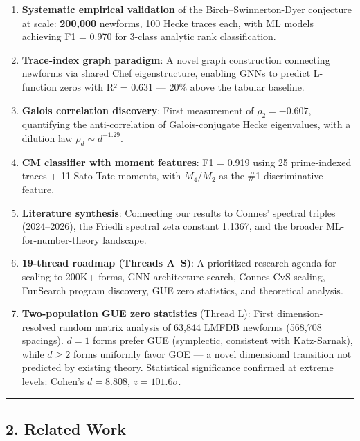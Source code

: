 \documentclass[
]{article}
\begin{document}
\begin{enumerate}
\def\labelenumi{\arabic{enumi}.}
\item
  \textbf{Systematic empirical validation} of the Birch--Swinnerton-Dyer
  conjecture at scale: \textbf{200,000} newforms, 100 Hecke traces each,
  with ML models achieving F1 = 0.970 for 3-class analytic rank
  classification.
\item
  \textbf{Trace-index graph paradigm}: A novel graph construction
  connecting newforms via shared Chef eigenstructure, enabling GNNs to
  predict L-function zeros with R² = 0.631 --- 20\% above the tabular
  baseline.
\item
  \textbf{Galois correlation discovery}: First measurement of
  \(\rho_2 = -0.607\), quantifying the anti-correlation of
  Galois-conjugate Hecke eigenvalues, with a dilution law
  \(\rho_d \sim d^{-1.29}\).
\item
  \textbf{CM classifier with moment features}: F1 = 0.919 using 25
  prime-indexed traces + 11 Sato-Tate moments, with \(M_4/M_2\) as the
  \#1 discriminative feature.
\item
  \textbf{Literature synthesis}: Connecting our results to Connes'
  spectral triples (2024--2026), the Friedli spectral zeta constant
  1.1367, and the broader ML-for-number-theory landscape.
\item
  \textbf{19-thread roadmap (Threads A--S)}: A prioritized research
  agenda for scaling to 200K+ forms, GNN architecture search, Connes CvS
  scaling, FunSearch program discovery, GUE zero statistics, and
  theoretical analysis.
\item
  \textbf{Two-population GUE zero statistics} (Thread L): First
  dimension-resolved random matrix analysis of 63,844 LMFDB newforms
  (568,708 spacings). \(d=1\) forms prefer GUE (symplectic, consistent
  with Katz-Sarnak), while \(d\ge 2\) forms uniformly favor GOE --- a
  novel dimensional transition not predicted by existing theory.
  Statistical significance confirmed at extreme levels: Cohen's
  \(d = 8.808\), \(z = 101.6\sigma\).
\end{enumerate}

\begin{center}\rule{0.5\linewidth}{0.5pt}\end{center}

\hypertarget{related-work}{%
\subsection{2. Related Work}\label{related-work}}
\end{document}
